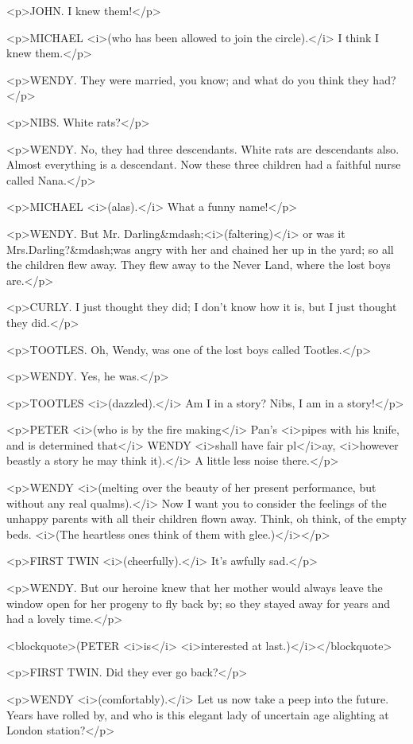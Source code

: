 <p>JOHN. I knew them!</p>

<p>MICHAEL <i>(who has been allowed to join the circle).</i> I think I knew them.</p>

<p>WENDY. They were married, you know; and what do you think they had?</p>

<p>NIBS. White rats?</p>

<p>WENDY. No, they had three descendants. White rats are descendants also. Almost everything is a descendant. Now these three children had a faithful nurse called Nana.</p>

<p>MICHAEL <i>(alas).</i> What a funny name!</p>

<p>WENDY. But Mr. Darling&mdash;<i>(faltering)</i> or was it Mrs.Darling?&mdash;was angry with her and chained her up in the yard; so all the children flew away. They flew away to the Never Land, where the lost boys are.</p>

<p>CURLY. I just thought they did; I don't know how it is, but I just thought they did.</p>

<p>TOOTLES. Oh, Wendy, was one of the lost boys called Tootles.</p>

<p>WENDY. Yes, he was.</p>

<p>TOOTLES <i>(dazzled).</i> Am I in a story? Nibs, I am in a story!</p>

<p>PETER <i>(who is by the fire making</i> Pan's <i>pipes with his knife, and is determined that</i> WENDY <i>shall have fair pl</i>ay, <i>however beastly a story he may think it).</i> A little less noise there.</p>

<p>WENDY <i>(melting over the beauty of her present performance, but without any real qualms).</i> Now I want you to consider the feelings of the unhappy parents with all their children flown away. Think, oh think, of the empty beds. <i>(The heartless ones think of them with glee.)</i></p>

<p>FIRST TWIN <i>(cheerfully).</i> It's awfully sad.</p>

<p>WENDY. But our heroine knew that her mother would always leave the window open for her progeny to fly back by; so they stayed away for years and had a lovely time.</p>

<blockquote>(PETER <i>is</i> <i>interested at last.)</i></blockquote>

<p>FIRST TWIN. Did they ever go back?</p>

<p>WENDY <i>(comfortably).</i> Let us now take a peep into the future. Years have rolled by, and who is this elegant lady of uncertain age alighting at London station?</p>

